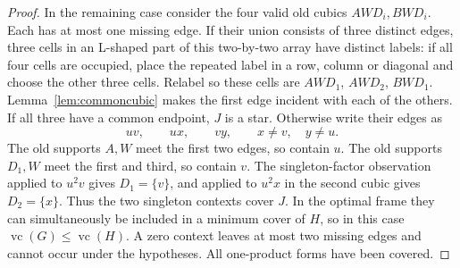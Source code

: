 \documentclass[11pt]{article}
\newcommand{\vc}{\operatorname{vc}}
\theoremstyle{definition}
\theoremstyle{remark}
\begin{document}
\begin{proof}
In the remaining case consider the four valid old cubics $AWD_i,BWD_i$. Each has at most one missing edge. If their union consists of three distinct edges, three cells in an L-shaped part of this two-by-two array have distinct labels: if all four cells are occupied, place the repeated label in a row, column or diagonal and choose the other three cells. Relabel so these cells are $AWD_1$, $AWD_2$, $BWD_1$. Lemma~\ref{lem:commoncubic} makes the first edge incident with each of the others. If all three have a common endpoint, $J$ is a star. Otherwise write their edges as
\[
 uv,\qquad ux,\qquad vy,
 \qquad x\ne v,\quad y\ne u.
\]
The old supports $A,W$ meet the first two edges, so contain $u$. The old supports $D_1,W$ meet the first and third, so contain $v$. The singleton-factor observation applied to $u^2v$ gives $D_1=\{v\}$, and applied to $u^2x$ in the second cubic gives $D_2=\{x\}$. Thus the two singleton contexts cover $J$. In the optimal frame they can simultaneously be included in a minimum cover of $H$, so in this case $\vc(G)\le\vc(H)$. A zero context leaves at most two missing edges and cannot occur under the hypotheses. All one-product forms have been covered.
\end{proof}
\end{document}
